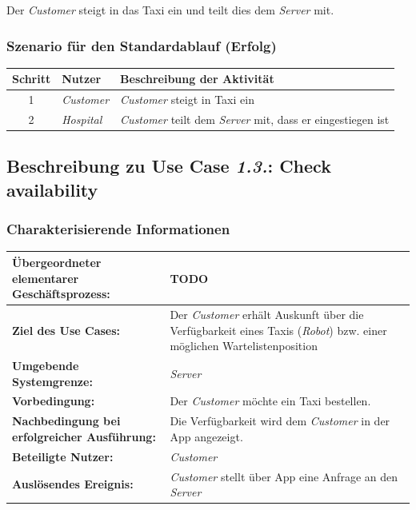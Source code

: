 				Der \emph{Customer} steigt in das Taxi ein und teilt dies dem \emph{Server} mit.
					\subsubsection*{Szenario für den Standardablauf (Erfolg)}
	
				\begin{table}[H]
					\centering
					\begin{tabularx}{\textwidth}{|c|p{2cm}|X|}
					\hline
					Schritt & Nutzer & Beschreibung der Aktivität \\ \hline
					1 & \emph{Customer} & \emph{Customer} steigt in Taxi ein \\
					2 & \emph{Hospital} & \emph{Customer} teilt dem \emph{Server} mit, dass er eingestiegen ist \\
					\hline
					\end{tabularx}
				\end{table}
				
				
			\subsection*{Beschreibung zu Use Case \emph{1.3.}: Check availability}
				\subsubsection*{Charakterisierende Informationen}
				
				\begin{table}[H]
					\centering
					\begin{tabularx}{\textwidth}{|p{5cm}|X|}
						\hline
						\textbf{Übergeordneter elementarer Geschäftsprozess:} & TODO  \\ \hline
						\textbf{Ziel des Use Cases:} & Der \emph{Customer} erhält Auskunft über die Verfügbarkeit eines Taxis (\emph{Robot}) bzw. einer möglichen Wartelistenposition \\ \hline
						\textbf{Umgebende Systemgrenze:} & \emph{Server} \\ \hline
						\textbf{Vorbedingung:} & Der \emph{Customer} möchte ein Taxi bestellen. \\ \hline
						\textbf{Nachbedingung bei erfolgreicher Ausführung:} & Die Verfügbarkeit wird dem \emph{Customer} in der App angezeigt. \\ \hline
						\textbf{Beteiligte Nutzer:} & \emph{Customer} \\ \hline
						\textbf{Auslösendes Ereignis:} & \emph{Customer} stellt über App eine Anfrage an den \emph{Server} \\
						\hline
					\end{tabularx}
				\end{table}
				
